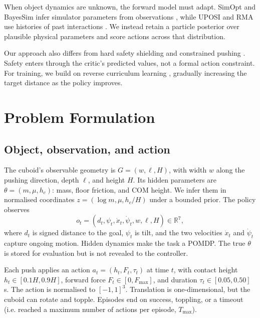 \documentclass[12pt]{article}
\newcommand{\real}{\mathbb{R}}
\begin{document}
When object dynamics are unknown, the forward model must adapt. SimOpt and BayesSim infer simulator parameters from observations \cite{simopt,bayessim}, while UPOSI and RMA use histories of past interactions \cite{uposi,rma}. We instead retain a particle posterior over plausible physical parameters and score actions across that distribution.

Our approach also differs from hard safety shielding \cite{shield} and constrained pushing \cite{dadiotis}. Safety enters through the critic's predicted values, not a formal action constraint. For training, we build on reverse curriculum learning \cite{florensa2017}, gradually increasing the target distance as the policy improves.

\section{Problem Formulation}\label{sec:formulation}
\subsection{Object, observation, and action}\label{sec:objects}
The cuboid's observable geometry is $G=(w,\ell,H)$, with width $w$ along the pushing direction, depth $\ell$, and height $H$. Its hidden parameters are $\theta=(m,\mu,h_c)$: mass, floor friction, and COM height. We infer them in normalised coordinates $z=(\log m,\mu,h_c/H)$ under a bounded prior. The policy observes
\begin{equation}o_t=(d_t,\psi_t,\dot x_t,\dot\psi_t,w,\ell,H)\in\real^7,\label{eq:obs}\end{equation}
where $d_t$ is signed distance to the goal, $\psi_t$ is tilt, and the two velocities $\dot x_t$ and $\dot\psi_t$ capture ongoing motion. Hidden dynamics make the task a POMDP. The true $\theta$ is stored for evaluation but is not revealed to the controller.

Each push applies an action $a_t=(h_t,F_t,\tau_t)$ at time $t$, with contact height $h_t\in[0.1H,0.9H]$, forward force $F_t\in[0,F_{\max}]$, and duration $\tau_t\in[0.05,0.50]$\,s. The action is normalised to $[-1,1]^3$. Translation is one-dimensional, but the cuboid can rotate and topple. Episodes end on success, toppling, or a timeout (i.e. reached a maximum number of actions per episode, $T_{\max}$).
\end{document}
